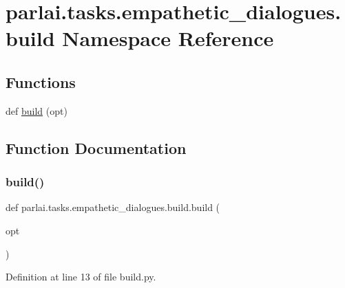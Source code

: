 \hypertarget{namespaceparlai_1_1tasks_1_1empathetic__dialogues_1_1build}{}\section{parlai.\+tasks.\+empathetic\+\_\+dialogues.\+build Namespace Reference}
\label{namespaceparlai_1_1tasks_1_1empathetic__dialogues_1_1build}
\subsection*{Functions}
\begin{DoxyCompactItemize}
\item 
def \hyperlink{namespaceparlai_1_1tasks_1_1empathetic__dialogues_1_1build_a01521757f3dbc3edcfe2f9ca39027688}{build} (opt)
\end{DoxyCompactItemize}


\subsection{Function Documentation}
\mbox{\label{namespaceparlai_1_1tasks_1_1empathetic__dialogues_1_1build_a01521757f3dbc3edcfe2f9ca39027688}} 
\subsubsection{\texorpdfstring{build()}{build()}}
{\footnotesize\ttfamily def parlai.\+tasks.\+empathetic\+\_\+dialogues.\+build.\+build (\begin{DoxyParamCaption}\item[{}]{opt }\end{DoxyParamCaption})}



Definition at line 13 of file build.\+py.

